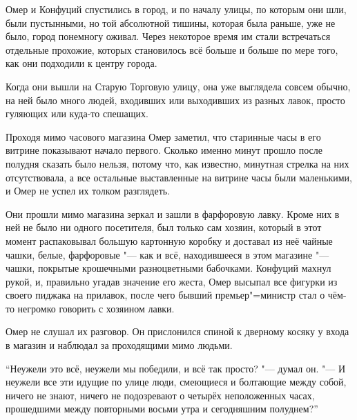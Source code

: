 Омер и Конфуций спустились в город, и по началу улицы, по которым они шли, были
пустынными, но той абсолютной тишины, которая была раньше, уже не было, город
понемногу оживал.
Через некоторое время им стали встречаться отдельные прохожие, которых
становилось всё больше и больше по мере того, как они подходили к центру города.

Когда они вышли на Старую Торговую улицу, она уже выглядела совсем обычно, на
ней было много людей, входивших или выходивших из разных лавок, просто гуляющих
или куда-то спешащих.

Проходя мимо часового магазина Омер заметил, что старинные часы в его витрине
показывают начало первого.
Сколько именно минут прошло после полудня сказать было нельзя, потому что, как
известно, минутная стрелка на них отсутствовала, а все остальные выставленные на
витрине часы были маленькими, и Омер не успел их толком разглядеть.

Они прошли мимо магазина зеркал и зашли в фарфоровую лавку.
Кроме них в ней не было ни одного посетителя, был только сам хозяин, который в
этот момент распаковывал большую картонную коробку и доставал из неё чайные
чашки, белые, фарфоровые "--- как и всё, находившееся в этом магазине "--- чашки,
покрытые крошечными разноцветными бабочками.
Конфуций махнул рукой, и, правильно угадав значение его жеста, Омер высыпал все
фигурки из своего пиджака на прилавок, после чего бывший премьер"=министр стал о
чём-то негромко говорить с хозяином лавки.

Омер не слушал их разговор.
Он прислонился спиной к дверному косяку у входа в магазин и наблюдал за
проходящими мимо людьми.

\enquote{Неужели это всё, неужели мы победили, и всё так просто? "--- думал он.
"--- И неужели все эти идущие по улице люди, смеющиеся и болтающие между собой,
ничего не знают, ничего не подозревают о четырёх неположенных часах, прошедшими
между повторными восьми утра и сегодняшним полуднем?}
